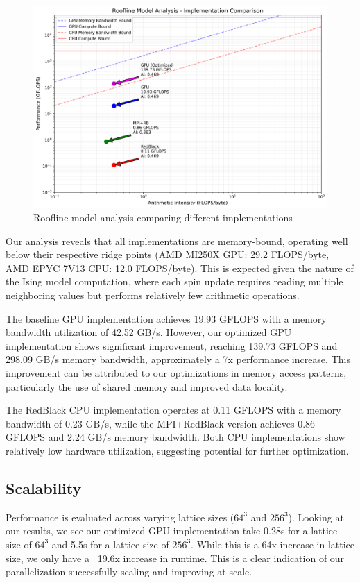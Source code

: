 \documentclass{article}
\begin{document}
\begin{figure}[H]
\centering
\includegraphics[width=\textwidth]{roofline_comparison.png}
\caption{Roofline model analysis comparing different implementations}
\label{fig:roofline}
\end{figure}

Our analysis reveals that all implementations are memory-bound, operating well below their respective ridge points (AMD MI250X GPU: 29.2 FLOPS/byte, AMD EPYC 7V13 CPU: 12.0 FLOPS/byte). This is expected given the nature of the Ising model computation, where each spin update requires reading multiple neighboring values but performs relatively few arithmetic operations.

The baseline GPU implementation achieves 19.93 GFLOPS with a memory bandwidth utilization of 42.52 GB/s. However, our optimized GPU implementation shows significant improvement, reaching 139.73 GFLOPS and 298.09 GB/s memory bandwidth, approximately a 7x performance increase. This improvement can be attributed to our optimizations in memory access patterns, particularly the use of shared memory and improved data locality.

The RedBlack CPU implementation operates at 0.11 GFLOPS with a memory bandwidth of 0.23 GB/s, while the MPI+RedBlack version achieves 0.86 GFLOPS and 2.24 GB/s memory bandwidth. Both CPU implementations show relatively low hardware utilization, suggesting potential for further optimization.

\subsection{Scalability}
Performance is evaluated across varying lattice sizes ($64^3$ and $256^3$). Looking at our results, we see our optimized GPU implementation take 0.28s for a lattice size of $64^3$ and 5.5s for a lattice size of $256^3$. 
While this is a 64x increase in lattice size, we only have a ~19.6x increase in runtime. This is a clear indication of our parallelization successfully scaling and improving at scale.
\end{document}
